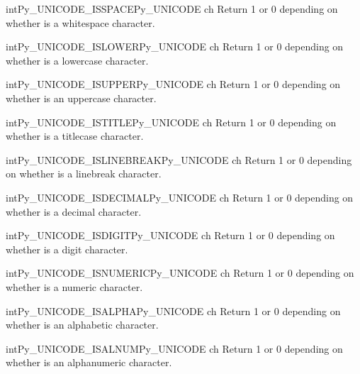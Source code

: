\begin{cfuncdesc}{int}{Py_UNICODE_ISSPACE}{Py_UNICODE ch}
  Return 1 or 0 depending on whether  is a whitespace
  character.
\end{cfuncdesc}

\begin{cfuncdesc}{int}{Py_UNICODE_ISLOWER}{Py_UNICODE ch}
  Return 1 or 0 depending on whether  is a lowercase character.
\end{cfuncdesc}

\begin{cfuncdesc}{int}{Py_UNICODE_ISUPPER}{Py_UNICODE ch}
  Return 1 or 0 depending on whether  is an uppercase
  character.
\end{cfuncdesc}

\begin{cfuncdesc}{int}{Py_UNICODE_ISTITLE}{Py_UNICODE ch}
  Return 1 or 0 depending on whether  is a titlecase character.
\end{cfuncdesc}

\begin{cfuncdesc}{int}{Py_UNICODE_ISLINEBREAK}{Py_UNICODE ch}
  Return 1 or 0 depending on whether  is a linebreak character.
\end{cfuncdesc}

\begin{cfuncdesc}{int}{Py_UNICODE_ISDECIMAL}{Py_UNICODE ch}
  Return 1 or 0 depending on whether  is a decimal character.
\end{cfuncdesc}

\begin{cfuncdesc}{int}{Py_UNICODE_ISDIGIT}{Py_UNICODE ch}
  Return 1 or 0 depending on whether  is a digit character.
\end{cfuncdesc}

\begin{cfuncdesc}{int}{Py_UNICODE_ISNUMERIC}{Py_UNICODE ch}
  Return 1 or 0 depending on whether  is a numeric character.
\end{cfuncdesc}

\begin{cfuncdesc}{int}{Py_UNICODE_ISALPHA}{Py_UNICODE ch}
  Return 1 or 0 depending on whether  is an alphabetic
  character.
\end{cfuncdesc}

\begin{cfuncdesc}{int}{Py_UNICODE_ISALNUM}{Py_UNICODE ch}
  Return 1 or 0 depending on whether  is an alphanumeric
  character.
\end{cfuncdesc}

